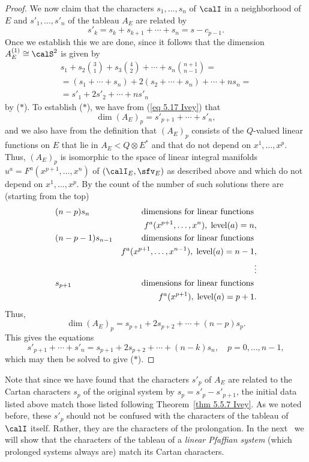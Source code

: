 \begin{proof}
    We now claim that the characters $s_1,\ldots,s_n$ of $\calI$ in a neighborhood of $E$ and $s'_1,\ldots,s'_n$ of the tableau $A_E$ are related by 
    \[\boxed{s'_k=s_k+s_{k+1}+\cdots+s_n=s-c_{p-1}.}\tag{$\ast$}\]
    Once we establish this we are done, since it follows that the dimension $A_E^{(1)}\cong\calS^2$ is given by 
    \begin{multline}
        s_1+s_2\binom{3}{1}+s_3\binom{4}{2}+\cdots+s_n\binom{n+1}{n-1}=\\
        =(s_1+\cdots+s_n)+2(s_2+\cdots +s_n)+\cdots +ns_n=\\
        =s'_1+2s'_2+\cdots+ns'_n
    \end{multline}
    by ($\ast$). To establish ($\ast$), we have from (\ref{eq 5.17 Ivey})  that 
    \[\dim (A_E)_p=s'_{p+1}+\cdots+s'_n,\]
    and we also have from the definition that $(A_E)_p$ consists of the $Q$-valued linear functions on $E$ that lie in $A_E<Q\otimes E^\ast$ and that do not depend on $x^1,\ldots,x^p$. Thus, $(A_E)_p$ is isomorphic to the space of linear integral manifolds $u^a=F^a(x^{p+1},\ldots,x^n)$ of $(\calI_E,\sfv_E)$ as described above and which do not depend on $x^1,\ldots,x^p$. By the count of the number of such solutions there are (starting from the top)
    \begin{align*}
        &(n-p)s_n &\text{dimensions for linear functions }\notag\\&& f^a(x^{p+1},\ldots,x^n),\;\mathrm{level}(a)=n,\\
        &(n-p-1)s_{n-1} &\text{dimensions for linear functions }\notag\\&&f^a(x^{p+1},\ldots,x^{n-1}),\;\mathrm{level}(a)=n-1,\\
        & &\vdots\notag\\
        &s_{p+1} &\text{dimensions for linear functions }\notag\\&&f^a(x^{p+1}),\;\mathrm{level}(a)=p+1.
    \end{align*}
    Thus, 
    \[\dim(A_E)_p=s_{p+1}+2s_{p+2}+\cdots +(n-p)s_p.\]
    This gives the equations 
    \[s'_{p+1}+\cdots+s'_n=s_{p+1}+2s_{p+2}+\cdots+(n-k)s_n,\quad p=0,\ldots,n-1,\]
    which may then be solved to give ($\ast$).
\end{proof}

Note that since we have found that the characters $s'_p$ of $A_E$ are related to the Cartan characters $s_p$ of the original system by $s_p=s'_p-s'_{p+1}$, the initial data listed above match those listed following Theorem~\ref{thm 5.5.7 Ivey}. As we noted before, these $s'_p$ should not be confused with the characters of the tableau of $\calI$ itself. Rather, they are the characters of the prolongation. In the next \sect\ we will show that the characters of the tableau of a \emph{linear Pfaffian system} (which prolonged systems always are) match its Cartan characters.







